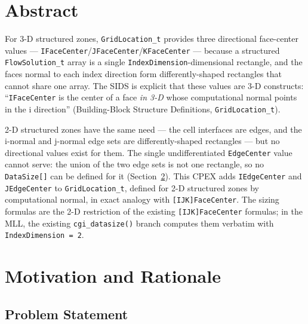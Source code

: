 \documentclass[11pt,letterpaper]{article}
\begin{document}
\vspace{1.5em}

\tableofcontents
\newpage

\section{Abstract}

For 3-D structured zones, \texttt{GridLocation\_t} provides three
directional face-center values ---
\texttt{IFaceCenter}/\texttt{JFaceCenter}/\texttt{KFaceCenter} --- because
a structured \texttt{FlowSolution\_t} array is a single
\texttt{IndexDimension}-dimensional rectangle, and the faces normal to
each index direction form differently-shaped rectangles that cannot share
one array. The SIDS is explicit that these values are 3-D constructs:
``\texttt{IFaceCenter} is the center of a face \emph{in 3-D} whose
computational normal points in the i direction'' (Building-Block
Structure Definitions, \texttt{GridLocation\_t}).

2-D structured zones have the same need --- the cell interfaces are
edges, and the i-normal and j-normal edge sets are differently-shaped
rectangles --- but no directional values exist for them. The single
undifferentiated \texttt{EdgeCenter} value cannot serve: the union of the
two edge sets is not one rectangle, so no \texttt{DataSize[]} can be
defined for it (Section~\ref{sec:motivation}). This CPEX adds
\texttt{IEdgeCenter} and \texttt{JEdgeCenter} to \texttt{GridLocation\_t},
defined for 2-D structured zones by computational normal, in exact
analogy with \texttt{[IJK]FaceCenter}. The sizing formulas are the 2-D
restriction of the existing \texttt{[IJK]FaceCenter} formulas; in the
MLL, the existing \texttt{cgi\_datasize()} branch computes them verbatim
with \texttt{IndexDimension~=~2}.

\section{Motivation and Rationale}
\label{sec:motivation}

\subsection{Problem Statement}
\end{document}
